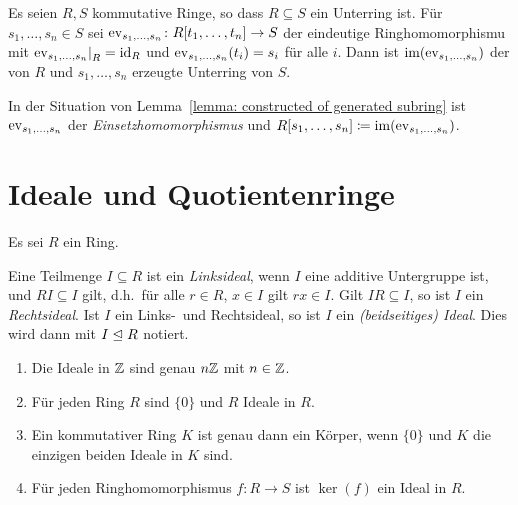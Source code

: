 \begin{lemma}
  \label{lemma: constructed of generated subring}
  Es seien $R, S$ kommutative Ringe, so dass $R \subseteq S$ ein Unterring ist.
  Für $s_1, \dotsc, s_n \in S$ sei $\operatorname{ev}_{s_1, \dotsc, s_n} \colon R[t_1, \dotsc, t_n] \to S$ der eindeutige Ringhomomorphismu mit $\restrict{\eval_{s_1, \dotsc, s_n}}{R} = \id_R$ und $\operatorname{ev}_{s_1, \dotsc, s_n}(t_i) = s_i$ für alle $i$.
  Dann ist $\operatorname{im}(\operatorname{ev}_{s_1, \dotsc, s_n})$ der von $R$ und $s_1, \dotsc, s_n$ erzeugte Unterring von $S$.
\end{lemma}

\begin{definition}
  In der Situation von Lemma~\ref{lemma: constructed of generated subring} ist $\operatorname{ev}_{s_1, \dotsc, s_n}$ der \emph{Einsetzhomomorphismus} und $R[s_1, \dotsc, s_n] \coloneqq \operatorname{im}(\operatorname{ev}_{s_1, \dotsc, s_n})$.
\end{definition}



\section{Ideale und Quotientenringe}

Es sei $R$ ein Ring.

\begin{definition}
  Eine Teilmenge $I \subseteq R$ ist ein \emph{Linksideal}, wenn $I$ eine additive Untergruppe ist, und $RI \subseteq I$ gilt, d.h.\ für alle $r \in R$, $x \in I$ gilt $rx \in I$.
  Gilt $IR \subseteq I$, so ist $I$ ein \emph{Rechtsideal}.
  Ist $I$ ein Links-\ und Rechtsideal, so ist $I$ ein \emph{\textup(beidseitiges\textup) Ideal}.
  Dies wird dann mit $I \mathrel{\trianglelefteq} R$ notiert.
\end{definition}

\begin{example}
  \begin{enumerate}
    \item
      Die Ideale in $\mathbb{Z}$ sind genau $n\mathbb{Z}$ mit $n \in \mathbb{Z}$.
    \item
      Für jeden Ring $R$ sind $\{0\}$ und $R$ Ideale in $R$.
    \item
      Ein kommutativer Ring $K$ ist genau dann ein Körper, wenn $\{0\}$ und $K$ die einzigen beiden Ideale in $K$ sind.
    \item
      Für jeden Ringhomomorphismus $f \colon R \to S$ ist $\ker(f)$ ein Ideal in $R$.
  \end{enumerate}
\end{example}


